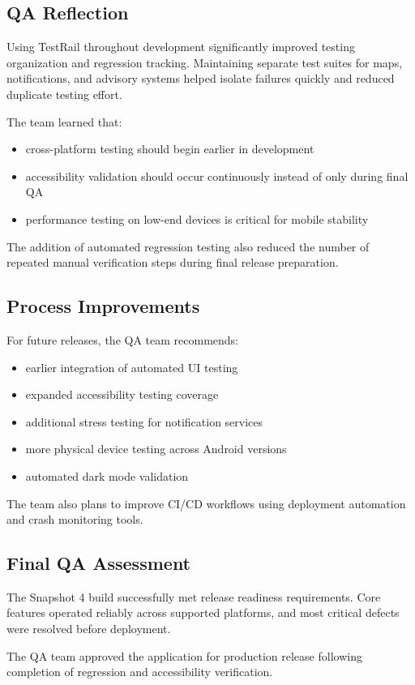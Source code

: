 \subsection{QA Reflection}

Using TestRail throughout development significantly improved testing organization and regression tracking. Maintaining separate test suites for maps, notifications, and advisory systems helped isolate failures quickly and reduced duplicate testing effort.

The team learned that:
\begin{itemize}
    \item cross-platform testing should begin earlier in development
    \item accessibility validation should occur continuously instead of only during final QA
    \item performance testing on low-end devices is critical for mobile stability
\end{itemize}

The addition of automated regression testing also reduced the number of repeated manual verification steps during final release preparation.

\subsection{Process Improvements}

For future releases, the QA team recommends:
\begin{itemize}
    \item earlier integration of automated UI testing
    \item expanded accessibility testing coverage
    \item additional stress testing for notification services
    \item more physical device testing across Android versions
    \item automated dark mode validation
\end{itemize}

The team also plans to improve CI/CD workflows using deployment automation and crash monitoring tools.

\subsection{Final QA Assessment}

The Snapshot 4 build successfully met release readiness requirements. Core features operated reliably across supported platforms, and most critical defects were resolved before deployment.

The QA team approved the application for production release following completion of regression and accessibility verification.
